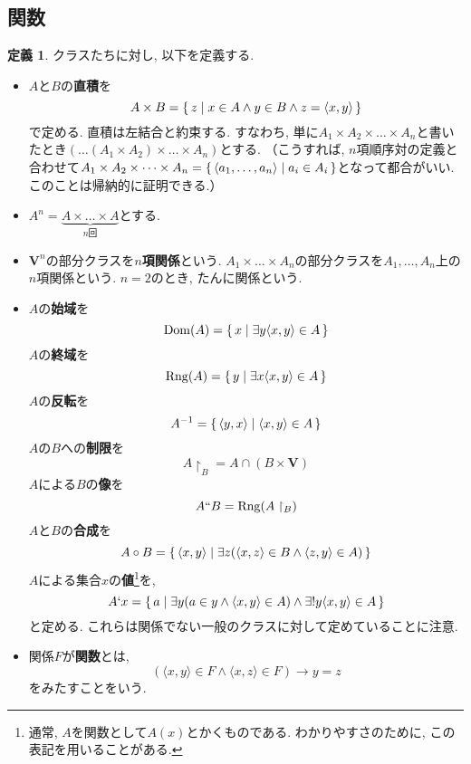 \documentclass[a4paper, twoside]{bxjsarticle}
\theoremstyle{definition}
\newtheorem{defn}[thm]{定義}
\begin{document}
    \subsection{関数}
        \begin{defn}
            クラスたちに対し, 以下を定義する.
           \begin{itemize}
                \item $A$と$B$の\textbf{直積}を\[A\times B = \set{z|x\in A \land y\in B \land z=\langle x, y \rangle}\]で定める. 直積は左結合と約束する. すなわち, 単に$A_1 \times A_2 \times \dots \times A_n$と書いたとき$(\dots(A_1 \times A_2) \times \dots \times A_n)$とする. （こうすれば, $n$項順序対の定義と合わせて$A_1 \times A_2 \times \dots \times A_n = \set{\langle a_1, \dots , a_n \rangle|a_i \in A_i}$となって都合がいい. このことは帰納的に証明できる.）
            
                \item $A^n = \underbrace{A \times \dots \times A}_{n\text{回}}$とする.
            
                \item $\textbf{V}^n$の部分クラスを\textbf{$n$項関係}という. $A_1 \times \dots \times A_n$の部分クラスを$A_1, \dots, A_n$上の$n$項関係という. $n=2$のとき, たんに関係という.
            
                \item $A$の\textbf{始域}を\[{\rm Dom}(A) = \set{x|\exists y \langle x, y \rangle \in A}\]$A$の\textbf{終域}を\[{\rm Rng}(A) =  \set{y|\exists x \langle x, y \rangle \in A}\]$A$の\textbf{反転}を\[A^{-1} = \set{\langle y, x \rangle|\langle x, y \rangle \in A}\]             $A$の$B$への\textbf{制限}を\[A\restriction_{B} = A\cap(B\times \textbf{V})\]$A$による$B$の\textbf{像}を\[A``B = {\rm Rng}(A\restriction_{B})\]$A$と$B$の\textbf{合成}を\[A\circ B = \set{\langle x, y \rangle| \exists z (\langle x, z \rangle \in B \land \langle z, y \rangle \in A)}\]
                $A$による集合$x$の\textbf{値}\footnote{通常, $A$を関数として$A(x)$とかくものである. わかりやすさのために, この表記を用いることがある.}を, \[A`x = \set{a|\exists y (a\in y \land \langle x, y \rangle \in A) \land \exists ! y \langle x, y\rangle \in A}\]
                と定める.
                これらは関係でない一般のクラスに対して定めていることに注意.
                
                \item 関係$F$が\textbf{関数}とは,\[(\langle x, y\rangle \in F \land \langle x, z\rangle \in F) \to y=z\]をみたすことをいう.
                

\end{itemize}
\end{defn}
\end{document}
